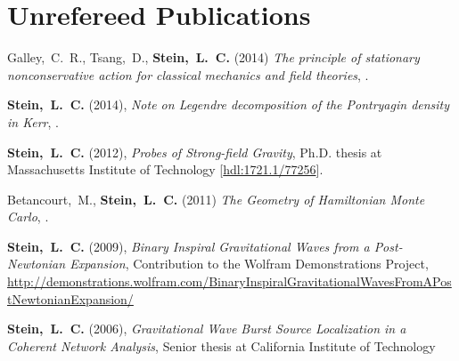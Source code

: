 \section{\sc Unrefereed Publications}
\addtocounter{pubCounter}{-1}
\begin{etaremune}[start=\value{pubCounter}]
\item
  Galley,~C.~R., Tsang,~D., {\bf Stein,~L.~C.}
  (2014)
  {\it The principle of stationary nonconservative action for
    classical mechanics and field theories},
  .
\item
  {\bf Stein,~L.~C.}
  (2014),
  {\it Note on Legendre decomposition of the Pontryagin density in Kerr},
  .
\item
  {\bf Stein,~L.~C.}
  (2012),
  {\it Probes of Strong-field Gravity}, Ph.D. thesis at Massachusetts
  Institute of Technology
  [\href{http://hdl.handle.net/1721.1/77256}{hdl:1721.1/77256}].
\item
  Betancourt,~M., {\bf Stein,~L.~C.}
  (2011)
  {\it The Geometry of Hamiltonian Monte Carlo},
  .
\item
  {\bf Stein,~L.~C.}
  (2009),
  {\it Binary Inspiral Gravitational Waves from a Post-Newtonian Expansion},
  Contribution to the Wolfram Demonstrations Project,
  \url{http://demonstrations.wolfram.com/BinaryInspiralGravitationalWavesFromAPostNewtonianExpansion/}
\item
  {\bf Stein,~L.~C.}
  (2006),
  {\it Gravitational Wave Burst Source Localization in a Coherent
    Network Analysis},
  Senior thesis at California Institute of Technology
\end{etaremune}


